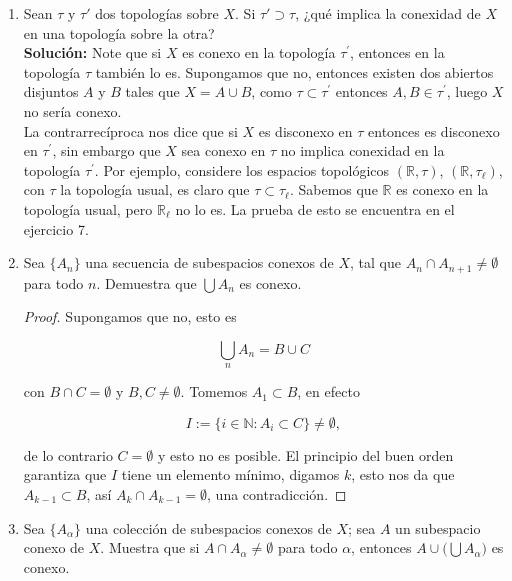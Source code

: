\documentclass[11pt]{article}
\begin{document}
\begin{enumerate}
    \item Sean $\tau$ y $\tau'$ dos topologías sobre $X$. Si $\tau' \supset \tau$, ¿qué implica la conexidad de $X$ en una topología sobre la otra?\\

    \textbf{Solución:} Note que si $X$ es conexo en la topología $\tau^{\prime}$, entonces en la topología $\tau$ también lo es. Supongamos que no, entonces existen dos abiertos disjuntos $A$ y $B$ tales que $X=A\cup B$, como $\tau\subset \tau^{\prime}$ entonces $A,B\in \tau^{\prime}$, luego $X$ no sería conexo.\\

    La contrarrecíproca nos dice que si $X$ es disconexo en $\tau$ entonces es disconexo en $\tau^{\prime}$, sin embargo que $X$ sea conexo en $\tau$ no implica conexidad  en la topología $\tau^{\prime}$. Por ejemplo, considere los espacios topológicos $(\mathbb{R},\tau)$, $(\mathbb{R},\tau_{\ell})$, con $\tau$ la topología usual, es claro que $\tau\subset \tau_{\ell}$. Sabemos que $\mathbb{R}$ es conexo en la topología usual, pero $\mathbb{R}_{\ell}$ no lo es. La prueba de esto se encuentra en el ejercicio 7.
    
    \item Sea $\{A_n\}$ una secuencia de subespacios conexos de $X$, tal que $A_n \cap A_{n+1} \neq \emptyset$ para todo $n$. Demuestra que $\bigcup A_n$ es conexo.

    \begin{proof}
        Supongamos que no, esto es

        $$\bigcup_{n}A_n=B\cup C 
            $$

        con $B\cap C=\emptyset$ y $B,C\neq \emptyset$. Tomemos $A_1\subset B$, en efecto
        
        $$I:=\{ i\in\mathbb{N}: A_i\subset C\}\neq \emptyset,$$

        de lo contrario $C=\emptyset$ y esto no es posible. El principio del buen orden garantiza que $I$ tiene un elemento mínimo, digamos $k$, esto nos da que $A_{k-1}\subset B$, así $A_k\cap A_{k-1}=\emptyset$, una contradicción. 
    \end{proof}
    
    \item Sea $\{A_\alpha\}$ una colección de subespacios conexos de $X$; sea $A$ un subespacio conexo de $X$. Muestra que si $A \cap A_\alpha \neq \emptyset$ para todo $\alpha$, entonces $A \cup \big(\bigcup A_\alpha\big)$ es conexo.


\end{enumerate}
\end{document}
